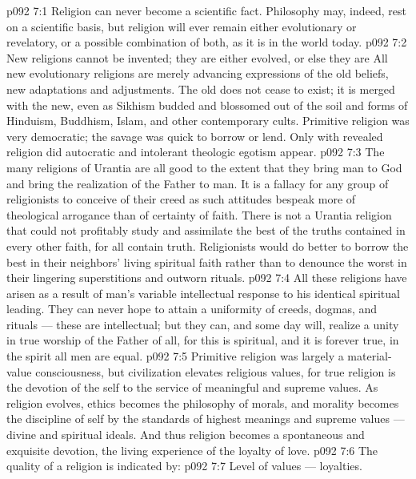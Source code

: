 \vs p092 7:1 Religion can never become a scientific fact. Philosophy may, indeed, rest on a scientific basis, but religion will ever remain either evolutionary or revelatory, or a possible combination of both, as it is in the world today.
\vs p092 7:2 New religions cannot be invented; they are either evolved, or else they are  All new evolutionary religions are merely advancing expressions of the old beliefs, new adaptations and adjustments. The old does not cease to exist; it is merged with the new, even as Sikhism budded and blossomed out of the soil and forms of Hinduism, Buddhism, Islam, and other contemporary cults. Primitive religion was very democratic; the savage was quick to borrow or lend. Only with revealed religion did autocratic and intolerant theologic egotism appear.
\vs p092 7:3 The many religions of Urantia are all good to the extent that they bring man to God and bring the realization of the Father to man. It is a fallacy for any group of religionists to conceive of their creed as  such attitudes bespeak more of theological arrogance than of certainty of faith. There is not a Urantia religion that could not profitably study and assimilate the best of the truths contained in every other faith, for all contain truth. Religionists would do better to borrow the best in their neighbors’ living spiritual faith rather than to denounce the worst in their lingering superstitions and outworn rituals.
\vs p092 7:4 All these religions have arisen as a result of man’s variable intellectual response to his identical spiritual leading. They can never hope to attain a uniformity of creeds, dogmas, and rituals --- these are intellectual; but they can, and some day will, realize a unity in true worship of the Father of all, for this is spiritual, and it is forever true, in the spirit all men are equal.
\vs p092 7:5 \pc Primitive religion was largely a material\hyp{}value consciousness, but civilization elevates religious values, for true religion is the devotion of the self to the service of meaningful and supreme values. As religion evolves, ethics becomes the philosophy of morals, and morality becomes the discipline of self by the standards of highest meanings and supreme values --- divine and spiritual ideals. And thus religion becomes a spontaneous and exquisite devotion, the living experience of the loyalty of love.
\vs p092 7:6 The quality of a religion is indicated by:
\vs p092 7:7 \bibnobreakspace Level of values --- loyalties.
